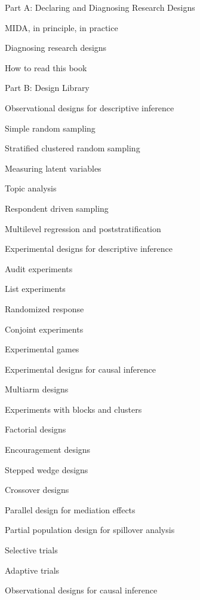 \documentclass[11pt]{article}
\begin{document}
\begin{legal}
\item {Part A: Declaring and Diagnosing Research Designs}

	\begin{legal}
	\item  MIDA, in principle, in practice
	\item  Diagnosing research designs
	\item  How to read this book
	\end{legal}

\item Part B: Design Library

	\begin{legal}
	\item Observational designs for descriptive inference
	
		\begin{legal}
		\item Simple random sampling
		\item Stratified clustered random sampling
		\item Measuring latent variables
		\item Topic analysis
		\item Respondent driven sampling
		\item Multilevel regression and poststratification
		\end{legal}
	
	\item Experimental designs for descriptive inference
	
		\begin{legal}
		\item 	Audit experiments
		\item 	List experiments
		\item 	Randomized response
		\item 	Conjoint experiments
		\item 	Experimental games
		\end{legal}
	
	\item Experimental designs for causal inference
	
		\begin{legal}
		\item 	Multiarm designs
		\item 	Experiments with blocks and clusters
		\item 	Factorial designs
		\item 	Encouragement designs 
		\item 	Stepped wedge designs		
   	    \item 	Crossover designs
   	    \item   Parallel design for mediation effects
		\item 	Partial population design for spillover analysis
		\item 	Selective trials
		\item         Adaptive trials 
		\end{legal}
\newpage
\vspace{-5mm}
	\item Observational designs for causal inference
	

\end{legal}
\end{legal}
\end{document}
